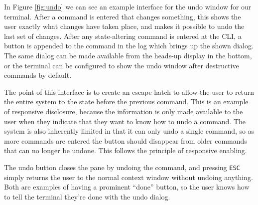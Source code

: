 In Figure \ref{fig:undo} we can see an example interface for the undo window for
our terminal. After a command is entered that changes something, this shows the
user exactly what changes have taken place, and makes it possible to undo the
last set of changes. After any state-altering command is entered at the CLI, a
button is appended to the command in the log which brings up the shown
dialog. The same dialog can be made available from the heads-up display in the
bottom, or the terminal can be configured to show the undo window after
destructive commands by default.

The point of this interface is to create an escape hatch to allow the user to
return the entire system to the state before the previous command. This is an
example of responsive disclosure, because the information is only made available
to the user when they indicate that they want to know how to undo a command. The
system is also inherently limited in that it can only undo a single command, so
as more commands are entered the button should disappear from older commands that can no longer be undone. This follows the principle of responsive enabling.

The undo button closes the pane by undoing the command, and pressing
\texttt{ESC} simply returns the user to the normal context window without
undoing anything. Both are examples of having a prominent ``done'' button, so
the user knows how to tell the terminal they're done with the undo dialog.
